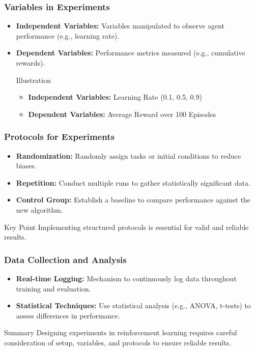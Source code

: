 \documentclass[aspectratio=169]{beamer}
\begin{document}
\begin{frame}[fragile]
    \frametitle{Variables in Experiments}
    \begin{itemize}
        \item \textbf{Independent Variables:} Variables manipulated to observe agent performance (e.g., learning rate).
        \item \textbf{Dependent Variables:} Performance metrics measured (e.g., cumulative rewards).
        \begin{exampleblock}{Illustration}
            \begin{itemize}
                \item \textbf{Independent Variables:} Learning Rate (0.1, 0.5, 0.9)
                \item \textbf{Dependent Variables:} Average Reward over 100 Episodes
            \end{itemize}
        \end{exampleblock}
    \end{itemize}
\end{frame}

\begin{frame}[fragile]
    \frametitle{Protocols for Experiments}
    \begin{itemize}
        \item \textbf{Randomization:} Randomly assign tasks or initial conditions to reduce biases.
        \item \textbf{Repetition:} Conduct multiple runs to gather statistically significant data.
        \item \textbf{Control Group:} Establish a baseline to compare performance against the new algorithm.
    \end{itemize}
    \begin{block}{Key Point}
        Implementing structured protocols is essential for valid and reliable results.
    \end{block}
\end{frame}

\begin{frame}[fragile]
    \frametitle{Data Collection and Analysis}
    \begin{itemize}
        \item \textbf{Real-time Logging:} Mechanism to continuously log data throughout training and evaluation.
        \item \textbf{Statistical Techniques:} Use statistical analysis (e.g., ANOVA, t-tests) to assess differences in performance.
    \end{itemize}
    \begin{block}{Summary}
        Designing experiments in reinforcement learning requires careful consideration of setup, variables, and protocols to ensure reliable results.
    \end{block}
\end{frame}
\end{document}
